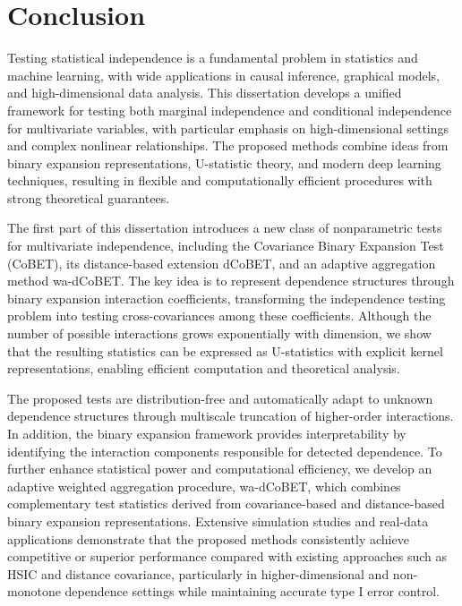 \documentclass[12pt,reqno,oneside]{amsbook}
\theoremstyle{definition}
\theoremstyle{remark}
\begin{document}
\section{Conclusion}

Testing statistical independence is a fundamental problem in statistics and machine learning, with wide applications in causal inference, graphical models, and high-dimensional data analysis. This dissertation develops a unified framework for testing both marginal independence and conditional independence for multivariate variables, with particular emphasis on high-dimensional settings and complex nonlinear relationships. The proposed methods combine ideas from binary expansion representations, U-statistic theory, and modern deep learning techniques, resulting in flexible and computationally efficient procedures with strong theoretical guarantees.

The first part of this dissertation introduces a new class of nonparametric tests for multivariate independence, including the Covariance Binary Expansion Test (CoBET), its distance-based extension dCoBET, and an adaptive aggregation method wa-dCoBET. The key idea is to represent dependence structures through binary expansion interaction coefficients, transforming the independence testing problem into testing cross-covariances among these coefficients. Although the number of possible interactions grows exponentially with dimension, we show that the resulting statistics can be expressed as U-statistics with explicit kernel representations, enabling efficient computation and theoretical analysis.

The proposed tests are distribution-free and automatically adapt to unknown dependence structures through multiscale truncation of higher-order interactions. In addition, the binary expansion framework provides interpretability by identifying the interaction components responsible for detected dependence. To further enhance statistical power and computational efficiency, we develop an adaptive weighted aggregation procedure, wa-dCoBET, which combines complementary test statistics derived from covariance-based and distance-based binary expansion representations. Extensive simulation studies and real-data applications demonstrate that the proposed methods consistently achieve competitive or superior performance compared with existing approaches such as HSIC and distance covariance, particularly in higher-dimensional and non-monotone dependence settings while maintaining accurate type I error control.
\end{document}
